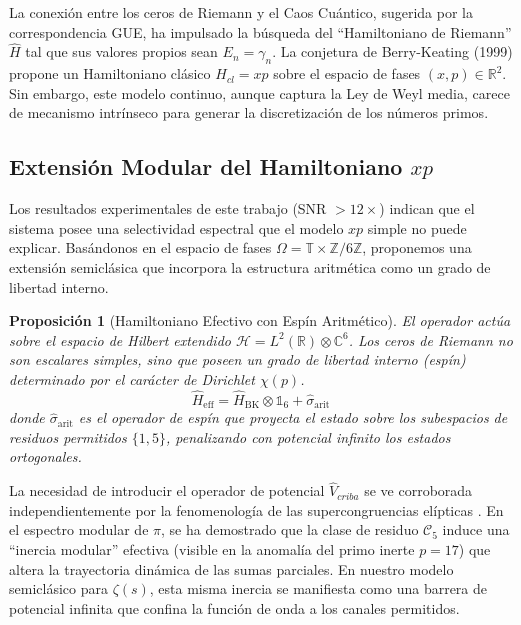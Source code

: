 \documentclass[12pt, a4paper]{article}
\theoremstyle{plain}
\newtheorem{proposicion}[teorema]{Proposición}
\theoremstyle{definition}
\newcommand{\Z}{\mathbb{Z}}
\newcommand{\R}{\mathbb{R}}
\newcommand{\C}{\mathbb{C}}
\newcommand{\T}{\mathbb{T}}
\newcommand{\Hilbert}{\mathscr{H}}
\begin{document}
La conexión entre los ceros de Riemann y el Caos Cuántico, sugerida por la correspondencia GUE, ha impulsado la búsqueda del ``Hamiltoniano de Riemann'' $\hat{H}$ tal que sus valores propios sean $E_n = \gamma_n$. La conjetura de Berry-Keating (1999) propone un Hamiltoniano clásico $H_{cl} = xp$ sobre el espacio de fases $(x,p) \in \R^2$. Sin embargo, este modelo continuo, aunque captura la Ley de Weyl media, carece de mecanismo intrínseco para generar la discretización de los números primos.

\subsection{Extensión Modular del Hamiltoniano $xp$}

Los resultados experimentales de este trabajo (SNR $> 12\times$) indican que el sistema posee una selectividad espectral que el modelo $xp$ simple no puede explicar. Basándonos en el espacio de fases $\Omega = \T \times \Z/6\Z$, proponemos una extensión semiclásica que incorpora la estructura aritmética como un grado de libertad interno.

\begin{proposicion}[Hamiltoniano Efectivo con Espín Aritmético]
El operador actúa sobre el espacio de Hilbert extendido $\Hilbert = L^2(\R) \otimes \C^6$. Los ceros de Riemann no son escalares simples, sino que poseen un grado de libertad interno (espín) determinado por el carácter de Dirichlet $\chi(p)$.
\begin{equation}
    \hat{H}_{\text{eff}} = \hat{H}_{\text{BK}} \otimes \mathds{1}_6 + \hat{\sigma}_{\text{arit}}
\end{equation}
donde $\hat{\sigma}_{\text{arit}}$ es el operador de espín que proyecta el estado sobre los subespacios de residuos permitidos $\{1, 5\}$, penalizando con potencial infinito los estados ortogonales.
\end{proposicion}

La necesidad de introducir el operador de potencial $\hat{V}_{criba}$ se ve corroborada independientemente por la fenomenología de las supercongruencias elípticas \cite{peinador_pi_2025}. En el espectro modular de $\pi$, se ha demostrado que la clase de residuo $\mathcal{C}_5$ induce una ``inercia modular'' efectiva (visible en la anomalía del primo inerte $p=17$) que altera la trayectoria dinámica de las sumas parciales. En nuestro modelo semiclásico para $\zeta(s)$, esta misma inercia se manifiesta como una barrera de potencial infinita que confina la función de onda a los canales permitidos.
\end{document}
